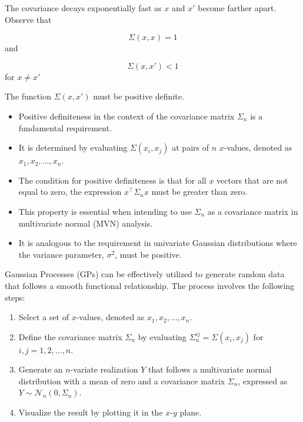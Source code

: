 \documentclass[
  letterpaper,
  DIV=11,
  numbers=noendperiod]{scrreprt}
\providecommand{\tightlist}{%
  \setlength{\itemsep}{0pt}\setlength{\parskip}{0pt}}\usepackage{longtable,booktabs,array}
\begin{document}
The covariance decays exponentially fast as \(x\) and \(x'\) become
farther apart. Observe that

\[\Sigma(x,x) = 1\] and

\[\Sigma(x, x') < 1\] for \(x \neq x'\)

The function \(\Sigma(x,x')\) must be positive definite.

\begin{tcolorbox}[enhanced jigsaw, left=2mm, toprule=.15mm, colframe=quarto-callout-note-color-frame, leftrule=.75mm, title=\textcolor{quarto-callout-note-color}{\faInfo}\hspace{0.5em}{Positive Definiteness}, toptitle=1mm, opacitybacktitle=0.6, arc=.35mm, titlerule=0mm, opacityback=0, bottomtitle=1mm, coltitle=black, rightrule=.15mm, colback=white, colbacktitle=quarto-callout-note-color!10!white, breakable, bottomrule=.15mm]

\begin{itemize}
\tightlist
\item
  Positive definiteness in the context of the covariance matrix
  \(\Sigma_n\) is a fundamental requirement.
\item
  It is determined by evaluating \(\Sigma(x_i, x_j)\) at pairs of \(n\)
  \(x\)-values, denoted as \(x_1, x_2, \ldots, x_n\).
\item
  The condition for positive definiteness is that for all \(x\) vectors
  that are not equal to zero, the expression \(x^\top \Sigma_n x\) must
  be greater than zero.
\item
  This property is essential when intending to use \(\Sigma_n\) as a
  covariance matrix in multivariate normal (MVN) analysis.
\item
  It is analogous to the requirement in univariate Gaussian
  distributions where the variance parameter, \(\sigma^2\), must be
  positive.
\end{itemize}

\end{tcolorbox}

Gaussian Processes (GPs) can be effectively utilized to generate random
data that follows a smooth functional relationship. The process involves
the following steps:

\begin{enumerate}
\def\labelenumi{\arabic{enumi}.}
\tightlist
\item
  Select a set of \(x\)-values, denoted as \(x_1, x_2, \ldots, x_n\).
\item
  Define the covariance matrix \(\Sigma_n\) by evaluating
  \(\Sigma_n^{ij} = \Sigma(x_i, x_j)\) for \(i, j = 1, 2, \ldots, n\).
\item
  Generate an \(n\)-variate realization \(Y\) that follows a
  multivariate normal distribution with a mean of zero and a covariance
  matrix \(\Sigma_n\), expressed as
  \(Y \sim \mathcal{N}_n(0, \Sigma_n)\).
\item
  Visualize the result by plotting it in the \(x\)-\(y\) plane.
\end{enumerate}
\end{document}
